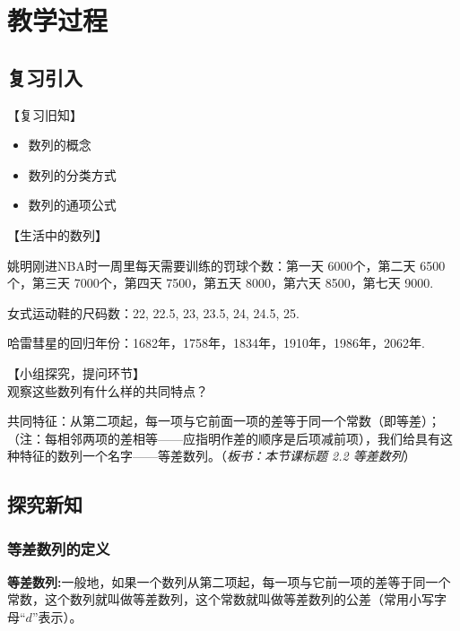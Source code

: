 \documentclass[10pt,a4paper]{article}
\begin{document}
	\section{教学过程}

		\subsection{复习引入} %
		\label{sub:复习引入}
		
			
			【复习旧知】

			\begin{itemize}
				\item 数列的概念
				\item 数列的分类方式
				\item 数列的通项公式
			\end{itemize}
			
			【生活中的数列】
			
			姚明刚进NBA时一周里每天需要训练的罚球个数：第一天 6000个，第二天 6500个，第三天 7000个，第四天 7500，第五天 8000，第六天 8500，第七天 9000. 

			女式运动鞋的尺码数：22, 22.5, 23, 23.5, 24, 24.5, 25. 

			哈雷彗星的回归年份：1682年，1758年，1834年，1910年，1986年，2062年. 
			\vspace{10pt}

			【小组探究，提问环节】\\
			观察这些数列有什么样的共同特点？ 
			\vspace{10pt}

			共同特征：从第二项起，每一项与它前面一项的差等于同一个常数（即等差）；（注：每相邻两项的差相等——应指明作差的顺序是后项减前项），我们给具有这种特征的数列一个名字——等差数列。（\emph{板书：本节课标题 2.2 等差数列}）

		\subsection{探究新知} %
		\label{sub:探究新知}
		
			\subsubsection{等差数列的定义}
			\textbf{等差数列:}一般地，如果一个数列从第二项起，每一项与它前一项的差等于同一个常数，这个数列就叫做等差数列，这个常数就叫做等差数列的公差（常用小写字母“$d$”表示）。
\end{document}
